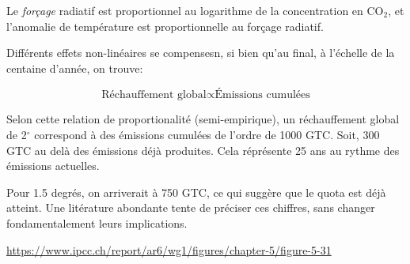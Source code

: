 Le \emph{forçage} radiatif est proportionnel au logarithme de la concentration en CO$_2$, et l'anomalie de température est proportionnelle au forçage radiatif. 

Différents effets non-linéaires se compensesn, si bien qu'au final, à l'échelle de la centaine d'année, on trouve: 

\begin{equation*}
  \text{Réchauffement global} \propto \text{Émissions cumulées}
\end{equation*}


Selon cette relation de proportionalité (semi-empirique), un réchauffement global de 2$^\circ$ correspond à des émissions cumulées de l'ordre de 1000 GTC. Soit, 300 GTC au delà des émissions déjà produites. 
Cela réprésente 25 ans au rythme des émissions actuelles. 

Pour 1.5 degrés, on arriverait à 750 GTC, ce qui suggère que le quota est déjà atteint. Une litérature abondante tente de préciser ces chiffres, sans changer fondamentalement leurs implications. 


\url{https://www.ipcc.ch/report/ar6/wg1/figures/chapter-5/figure-5-31}
